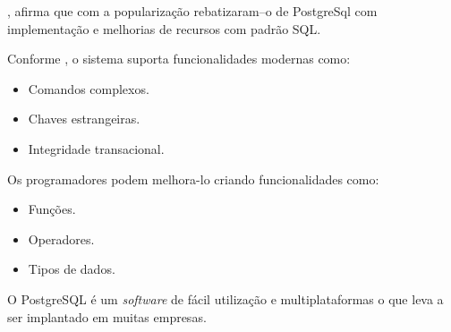	\par {}, afirma que com a popularização rebatizaram–o de
PostgreSql com implementação e melhorias de recursos com padrão SQL.

	\par Conforme , o sistema suporta funcionalidades modernas
como:

\begin{itemize}
  \item Comandos complexos. 
  \item Chaves estrangeiras.
  \item Integridade transacional. 
\end{itemize}
	
	\par Os programadores podem melhora-lo criando funcionalidades como:
\begin{itemize}
  \item Funções.
  \item Operadores. 
  \item Tipos de dados. 
\end{itemize}

	\par O PostgreSQL é um \textit{software} de fácil utilização e multiplataformas
o que leva a ser implantado em muitas empresas.

















